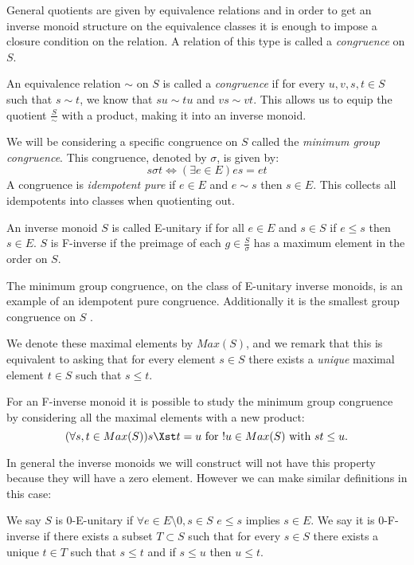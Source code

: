 General quotients are given by equivalence relations and in order to get an inverse monoid structure on the equivalence classes it is enough to impose a closure condition on the relation. A relation of this type is called a \textit{congruence} on $S$.

\begin{definition}
An equivalence relation $\sim$ on $S$ is called a \textit{congruence} if for every $u,v,s,t \in S$ such that $s \sim t$, we know that $su\sim tu$ and $vs \sim vt$. This allows us to equip the quotient $\frac{S}{\sim}$ with a product, making it into an inverse monoid.
\end{definition}

We will be considering a specific congruence on $S$ called the \textit{minimum group congruence}.  This congruence, denoted by $\sigma$, is given by:
\begin{equation*}
s \sigma t \Leftrightarrow (\exists e \in E) es = et
\end{equation*}
A congruence is \textit{idempotent pure} if $e\in E$ and $e \sim s$ then $s \in E$. This collects all idempotents into classes when quotienting out. 
\begin{definition}
An inverse monoid $S$ is called E-unitary if for all $e \in E$ and $s \in S$ if $e \leq s$ then $s \in E$. $S$ is F-inverse if the preimage of each $g \in \frac{S}{\sigma}$ has a maximum element in the order on $S$.
\end{definition}
The minimum group congruence, on the class of E-unitary inverse monoids, is an example of an idempotent pure congruence. Additionally it is the smallest group congruence on $S$ \cite{MR1694900}.

We denote these maximal elements by $Max(S)$, and we remark that this is equivalent to asking that for every element $s \in S$ there exists a \textit{unique} maximal element $t \in S$ such that $s \leq t$.

For an F-inverse monoid it is possible to study the minimum group congruence by considering all the maximal elements with a new product:
\begin{equation*}
(\forall s,t \in Max(S)) s \Xst t = u \mbox{ for } !u \in Max(S) \mbox{ with } st \leq u.
\end{equation*}

In general the inverse monoids we will construct will not have this property because they will have a zero element. However we can make similar definitions in this case:

\begin{definition}
We say $S$ is 0-E-unitary if $\forall e \in E\setminus 0, s \in S$ $e \leq s$ implies $s \in E$. We say it is 0-F-inverse if there exists a subset $T \subset S$ such that for every $s \in S$ there exists a unique $t \in T$ such that $s \leq t$ and if $s \leq u$ then $u \leq t$.
\end{definition}


